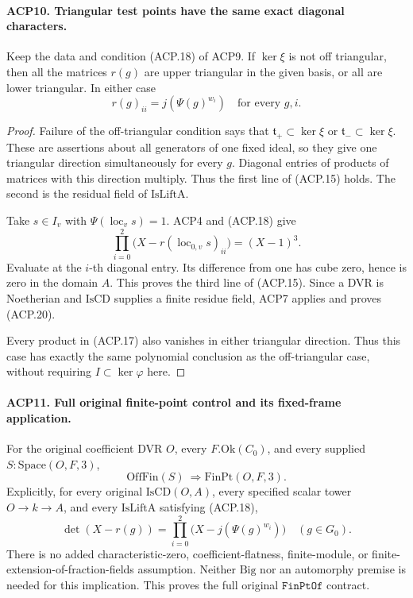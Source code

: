 \paragraph{ACP10. Triangular test points have the same exact diagonal characters.}
\label{claim:ACP10}
Keep the data and condition (ACP.18) of ACP9.  If \(\ker\xi\)
is not off triangular, then all the matrices \(r(g)\) are
upper triangular in the given basis, or all are lower triangular.
In either case
\[
                 r(g)_{ii}=j(\Psi(g)^{w_i})
                 \quad\text{for every }g,i.
                                                        \tag{ACP.20}
\]

\begin{proof}
Failure of the off-triangular condition says that
\(\mathfrak t_+\subset\ker\xi\) or
\(\mathfrak t_-\subset\ker\xi\).  These are assertions
about all generators of one fixed ideal, so they give one
triangular direction simultaneously for every \(g\).
Diagonal entries of products of matrices with this direction
multiply.  Thus the first line of (ACP.15) holds.
The second is the residual field of \(\mathrm{IsLiftA}\).

Take \(s\in I_v\) with \(\Psi(\operatorname{loc}_v s)=1\).
ACP4 and (ACP.18) give
\[
 \prod_{i=0}^2\bigl(X-r(\operatorname{loc}_{0,v}s)_{ii}\bigr)
                                                    =(X-1)^3.
\]
Evaluate at the \(i\)-th diagonal entry.  Its difference from
one has cube zero, hence is zero in the domain \(A\).
This proves the third line of (ACP.15).  Since a DVR is
Noetherian and \(\mathrm{IsCD}\) supplies a finite residue
field, ACP7 applies and proves (ACP.20).

Every product in (ACP.17) also vanishes in either triangular
direction.  Thus this case has exactly the same polynomial
conclusion as the off-triangular case, without requiring
\(I\subset\ker\varphi\) here.
\end{proof}

\paragraph{ACP11. Full original finite-point control and its fixed-frame application.}
\label{claim:ACP11}
For the original coefficient DVR \(O\), every
\(F.\mathrm{Ok}(C_0)\), and every supplied
\(S:\mathrm{Space}(O,F,3)\),
\[
               \mathrm{OffFin}(S)\ \Longrightarrow
                         \mathrm{FinPt}(O,F,3).
                                                        \tag{ACP.21}
\]
Explicitly, for every original \(\mathrm{IsCD}(O,A)\), every
specified scalar tower \(O\to k\to A\), and every
\(\mathrm{IsLiftA}\) satisfying (ACP.18),
\[
 \det(X-r(g))=
   \prod_{i=0}^2\bigl(X-j(\Psi(g)^{w_i})\bigr)
                            \quad(g\in G_0).
                                                        \tag{ACP.22}
\]
There is no added characteristic-zero, coefficient-flatness,
finite-module, or finite-extension-of-fraction-fields assumption.
Neither \(\mathrm{Big}\) nor an automorphy premise is needed
for this implication.  This proves the full original
\(\texttt{FinPtOf}\) contract.

